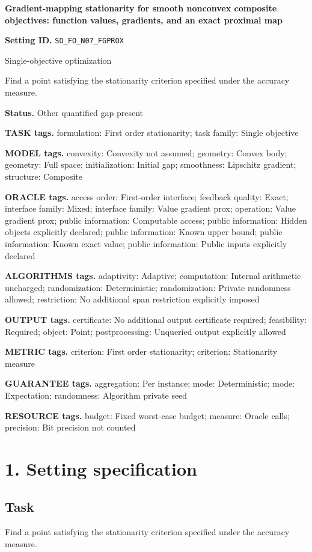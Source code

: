 \documentclass[10pt,a4paper]{article}
\begin{document}
\raggedright

{\LARGE\bfseries\sffamily\color{AtlasNavy} Gradient-mapping stationarity for smooth nonconvex composite objectives: function values, gradients, and an exact proximal map\par}\vspace{5pt}
\textbf{Setting ID.} \texttt{SO\_\allowbreak{}FO\_\allowbreak{}N07\_\allowbreak{}FGPROX}

Single-objective optimization

Find a point satisfying the stationarity criterion specified under the accuracy measure.

\textbf{Status.} Other quantified gap present

\textbf{TASK tags.} formulation: First order stationarity; task family: Single objective

\textbf{MODEL tags.} convexity: Convexity not assumed; geometry: Convex body; geometry: Full space; initialization: Initial gap; smoothness: Lipschitz gradient; structure: Composite

\textbf{ORACLE tags.} access order: First-order interface; feedback quality: Exact; interface family: Mixed; interface family: Value gradient prox; operation: Value gradient prox; public information: Computable access; public information: Hidden objects explicitly declared; public information: Known upper bound; public information: Known exact value; public information: Public inputs explicitly declared

\textbf{ALGORITHMS tags.} adaptivity: Adaptive; computation: Internal arithmetic uncharged; randomization: Deterministic; randomization: Private randomness allowed; restriction: No additional span restriction explicitly imposed

\textbf{OUTPUT tags.} certificate: No additional output certificate required; feasibility: Required; object: Point; postprocessing: Unqueried output explicitly allowed

\textbf{METRIC tags.} criterion: First order stationarity; criterion: Stationarity measure

\textbf{GUARANTEE tags.} aggregation: Per instance; mode: Deterministic; mode: Expectation; randomness: Algorithm private seed

\textbf{RESOURCE tags.} budget: Fixed worst-case budget; measure: Oracle calls; precision: Bit precision not counted

\section{1. Setting specification}
\subsection{Task}
Find a point satisfying the stationarity criterion specified under the accuracy measure.
\end{document}
